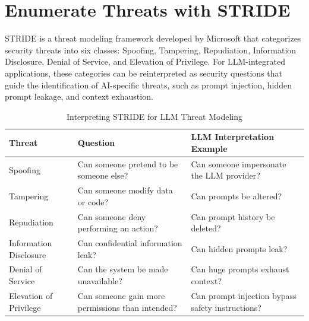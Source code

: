 \documentclass[a4paper,12pt]{report}
\begin{document}
\section{Enumerate Threats with STRIDE}
STRIDE is a threat modeling framework developed by Microsoft that categorizes
security threats into six classes: Spoofing, Tampering, Repudiation,
Information Disclosure, Denial of Service, and Elevation of Privilege.
For LLM-integrated applications, these categories can be reinterpreted as
security questions that guide the identification of AI-specific threats, such
as prompt injection, hidden prompt leakage, and context exhaustion.

\begin{table}[ht]
\centering
\caption{Interpreting STRIDE for LLM Threat Modeling}
\label{tab:stride_llm}
\renewcommand{\arraystretch}{1.3}
\begin{tabular}{|p{2.2cm}|p{4.8cm}|p{6.5cm}|}
\hline
\textbf{Threat} &
\textbf{Question} &
\textbf{LLM Interpretation Example} \\
\hline
Spoofing &
Can someone pretend to be someone else? &
Can someone impersonate the LLM provider? \\
\hline
Tampering &
Can someone modify data or code? &
Can prompts be altered? \\
\hline
Repudiation &
Can someone deny performing an action? &
Can prompt history be deleted? \\
\hline
Information Disclosure &
Can confidential information leak? &
Can hidden prompts leak? \\
\hline
Denial of Service &
Can the system be made unavailable? &
Can huge prompts exhaust context? \\
\hline
Elevation of Privilege &
Can someone gain more permissions than intended? &
Can prompt injection bypass safety instructions? \\
\hline
\end{tabular}
\end{table}
\end{document}
